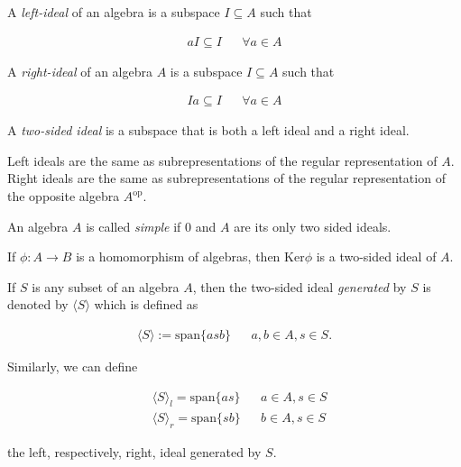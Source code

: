 \begin{defn}
A \emph{left-ideal} of an algebra  is a subspace \(I\subseteq A\) such that 

\begin{align*}aI\subseteq I && \forall a\in A\end{align*}

A \emph{right-ideal} of an algebra \(A\) is a subspace \(I\subseteq A\) such that 

\begin{align*}Ia\subseteq I && \forall a\in A\end{align*}

A \emph{two-sided ideal} is a subspace that is both a left ideal and a right ideal.
\end{defn}

\begin{thm}
Left ideals are the same as subrepresentations of the regular representation of \(A\). Right ideals are the same as subrepresentations of the regular representation of the opposite algebra \(A^{\text{op}}\).
\end{thm}

\begin{defn}
An algebra \(A\) is called \emph{simple} if \(0\) and \(A\) are its only two sided ideals.
\end{defn}

\begin{thm}
If \(\phi :A\rightarrow B\) is a homomorphism of algebras, then \(\text{Ker} \phi \) is a two-sided ideal of \(A\).
\end{thm}

\begin{defn}
If \(S\) is any subset of an algebra \(A\), then the two-sided ideal \emph{generated} by \(S\) is denoted by \(\langle S\rangle \) which is defined as 

\begin{align*}\langle S\rangle :=\text{span}\{asb\} &&a,b\in A,s\in S.\end{align*}

Similarly, we can define

\begin{align*}&\langle S\rangle _{l} =\text{span}\{as\} &&a\in A,s\in S \\
&\langle S\rangle _{r} =\text{span}\{sb\} &&b\in A,s\in S\end{align*}

the left, respectively, right, ideal generated by \(S\).
\end{defn}

